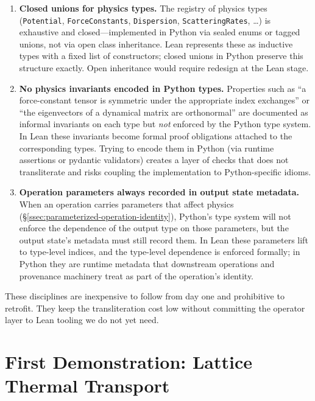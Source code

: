 \documentclass[11pt,a4paper]{article}
\begin{document}
\begin{enumerate}[leftmargin=2em]
  \item \textbf{Closed unions for physics types.} The registry of physics types
        (\texttt{Potential}, \texttt{ForceConstants}, \texttt{Dispersion},
        \texttt{ScatteringRates}, \ldots) is exhaustive and closed---implemented in Python via
        sealed enums or tagged unions, not via open class inheritance. Lean represents these as
        inductive types with a fixed list of constructors; closed unions in Python preserve this
        structure exactly. Open inheritance would require redesign at the Lean stage.
  \item \textbf{No physics invariants encoded in Python types.} Properties such as ``a
        force-constant tensor is symmetric under the appropriate index exchanges'' or ``the
        eigenvectors of a dynamical matrix are orthonormal'' are documented as informal
        invariants on each type but \emph{not} enforced by the Python type system. In Lean these
        invariants become formal proof obligations attached to the corresponding types. Trying
        to encode them in Python (via runtime assertions or pydantic validators) creates a layer
        of checks that does not transliterate and risks coupling the implementation to
        Python-specific idioms.
  \item \textbf{Operation parameters always recorded in output state metadata.} When an operation
        carries parameters that affect physics (\S\ref{ssec:parameterized-operation-identity}),
        Python's type system will not enforce the dependence of the output type on those
        parameters, but the output state's metadata must still record them. In Lean these
        parameters lift to type-level indices, and the type-level dependence is enforced
        formally; in Python they are runtime metadata that downstream operations and provenance
        machinery treat as part of the operation's identity.
\end{enumerate}

These disciplines are inexpensive to follow from day one and prohibitive to retrofit. They keep
the transliteration cost low without committing the operator layer to Lean tooling we do not yet
need.


\section{First Demonstration: Lattice Thermal Transport}
\label{sec:demo}
\end{document}
